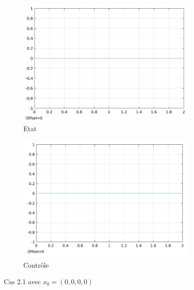 \documentclass[a4paper]{article}
\begin{document}
                        \begin{figure}[h!]
                                \centering
                                \begin{subfigure}[b]{0.45\textwidth}
                                        \includegraphics[width=\textwidth]{images/courbe_cas_2_1_TP03.png}
                                        \caption{Etat}
                                        \label{fig3.8.1}
                                \end{subfigure}
                                \hspace{30pt}
                                \begin{subfigure}[b]{0.45\textwidth}
                                        \includegraphics[width=\textwidth]{images/controle_cas_2_1_TP03.png}
                                        \caption{Contrôle}
                                        \label{fig3.8.2}
                                \end{subfigure}
                                \caption{Cas 2.1 avec $x_0=(0,0,0,0)$}
                                \label{fig3.8}
                        \end{figure}
\end{document}
